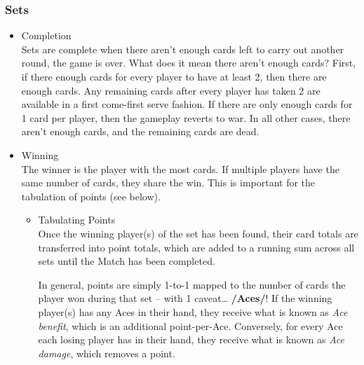 \documentclass[11pt]{article}
\begin{document}
\subsubsection{Sets}
\label{sec-2-2-3}
\begin{itemize}

\item Completion\\
\label{sec-2-2-3-1}%
Sets are complete when there aren't enough cards left to carry out
another round, the game is over. What does it mean there aren't enough
cards? First, if there enough cards for every player to have at least
2, then there are enough cards. Any remaining cards after every player
has taken 2 are available in a first come-first serve fashion. If
there are only enough cards for 1 card per player, then the gameplay
reverts to war. In all other cases, there aren't enough cards, and the
remaining cards are dead.


\item Winning\\
\label{sec-2-2-3-2}%
The winner is the player with the most cards. If multiple players have
the same number of cards, they share the win. This is important for
the tabulation of points (see below).

\begin{itemize}

\item Tabulating Points\\
\label{sec-2-2-3-2-1}%
Once the winning player(s) of the set has been found, their card
totals are transferred into point totals, which are added to a running
sum across all sets until the Match has been completed. 

In general, points are simply 1-to-1 mapped to the number of cards the
player won during that set -- with 1 caveat\ldots{} \textbf{/Aces/}! If the winning
player(s) has any Aces in their hand, they receive what is known as
\emph{Ace benefit}, which is an additional point-per-Ace. Conversely, for
every Ace each losing player has in their hand, they receive what is
known as \emph{Ace damage}, which removes a point.

\end{itemize} %
\end{itemize} %
\end{document}
